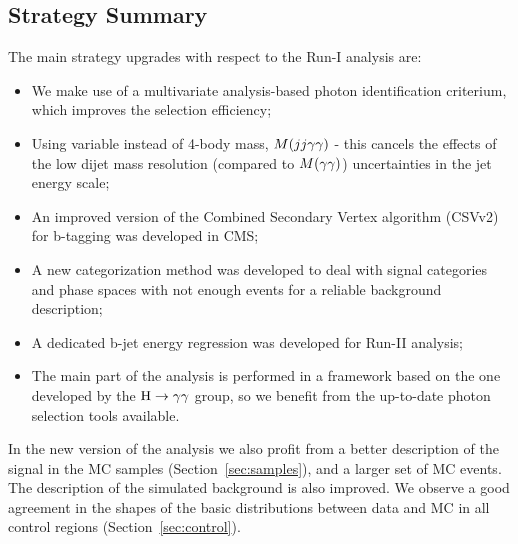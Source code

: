 
\subsection{Strategy Summary}

The main strategy upgrades with respect to the Run-I analysis are:
\begin{itemize}

\item We make use of a multivariate analysis-based photon identification criterium, which improves the selection efficiency;

\item Using \Mtilde variable instead of 4-body mass, $M(jj\gamma\gamma)$ - this cancels the effects of the low dijet mass resolution (compared to $M(\gamma\gamma)$) uncertainties in the jet energy scale;

\item An improved version of the Combined Secondary Vertex algorithm (CSVv2) for b-tagging was developed in CMS;

\item A new categorization method was developed to deal with signal categories and phase spaces with not enough events for a reliable background description;

\item A dedicated b-jet energy regression was developed for Run-II analysis; 

\item The main part of the analysis is performed in a framework based on the one developed by the $\mathrm{H}\to\gamma\gamma$ group, so we benefit from the up-to-date photon selection tools available.

\end{itemize}

In the new version of the analysis we also profit from a better description of the signal in the MC
samples (Section~\ref{sec:samples}), and a larger set of MC events. The
description of the simulated background is also improved. We observe a good agreement in
the shapes of the basic distributions between data and MC in all control regions (Section~\ref{sec:control}).

